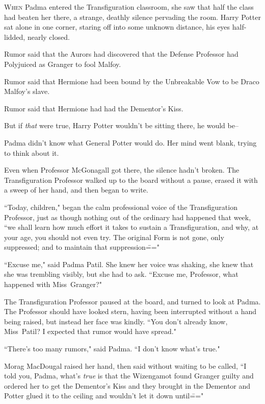 
\lettrine{W}{hen} Padma entered the Transfiguration classroom, she saw that half the class had beaten her there, a strange, deathly silence pervading the room. Harry Potter sat alone in one corner, staring off into some unknown distance, his eyes half-lidded, nearly closed.

Rumor said that the Aurors had discovered that the Defense Professor had Polyjuiced as Granger to fool Malfoy.

Rumor said that Hermione had been bound by the Unbreakable Vow to be Draco Malfoy's slave.

Rumor said that Hermione had had the Dementor's Kiss.

But if \emph{that} were true, Harry Potter wouldn't be sitting there, he would be\---

Padma didn't know what General Potter would do. Her mind went blank, trying to think about it.

Even when Professor McGonagall got there, the silence hadn't broken. The Transfiguration Professor walked up to the board without a pause, erased it with a sweep of her hand, and then began to write.

``Today, children," began the calm professional voice of the Transfiguration Professor, just as though nothing out of the ordinary had happened that week, ``we shall learn how much effort it takes to sustain a Transfiguration, and why, at your age, you should not even try. The original Form is not gone, only suppressed; and to maintain that suppression\==="

``Excuse me," said Padma Patil. She knew her voice was shaking, she knew that she was trembling visibly, but she had to ask. ``Excuse me, Professor, what happened with Miss~Granger?"

The Transfiguration Professor paused at the board, and turned to look at Padma. The Professor should have looked stern, having been interrupted without a hand being raised, but instead her face was kindly. ``You don't already know, Miss~Patil? I expected that rumor would have spread."

``There's too many rumors," said Padma. ``I don't know what's true."

Morag MacDougal raised her hand, then said without waiting to be called, ``I told you, Padma, what's \emph{true} is that the Wizengamot found Granger guilty and ordered her to get the Dementor's Kiss and they brought in the Dementor and Potter glued it to the ceiling and wouldn't let it down until\==="

